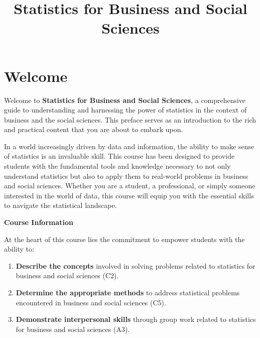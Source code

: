 \documentclass[
  a4paper,
  DIV=11,
  numbers=noendperiod,
  oneside]{scrreprt}
\title{Statistics for Business and Social Sciences}
\author{}
\date{}
\renewcommand*\contentsname{Table of contents}
\newcommand\contentsname{Table of contents}
\begin{document}
\maketitle
\ifdefined\Shaded\renewenvironment{Shaded}{\begin{tcolorbox}[boxrule=0pt, sharp corners, breakable, borderline west={3pt}{0pt}{shadecolor}, interior hidden, frame hidden, enhanced]}{\end{tcolorbox}}\fi

\renewcommand*\contentsname{Table of contents}
{
\hypersetup{linkcolor=}
\setcounter{tocdepth}{2}
\tableofcontents
}

\hypertarget{welcome}{%
\chapter*{Welcome}\label{welcome}}


Welcome to \textbf{Statistics for Business and Social Sciences}, a
comprehensive guide to understanding and harnessing the power of
statistics in the context of business and the social sciences. This
preface serves as an introduction to the rich and practical content that
you are about to embark upon.

In a world increasingly driven by data and information, the ability to
make sense of statistics is an invaluable skill. This course has been
designed to provide students with the fundamental tools and knowledge
necessary to not only understand statistics but also to apply them to
real-world problems in business and social sciences. Whether you are a
student, a professional, or simply someone interested in the world of
data, this course will equip you with the essential skills to navigate
the statistical landscape.

\textbf{Course Information}

At the heart of this course lies the commitment to empower students with
the ability to:

\begin{enumerate}
\def\labelenumi{\arabic{enumi}.}
\item
  \textbf{Describe the concepts} involved in solving problems related to
  statistics for business and social sciences (C2).
\item
  \textbf{Determine the appropriate methods} to address statistical
  problems encountered in business and social sciences (C5).
\item
  \textbf{Demonstrate interpersonal skills} through group work related
  to statistics for business and social sciences (A3).
\end{enumerate}
\end{document}
